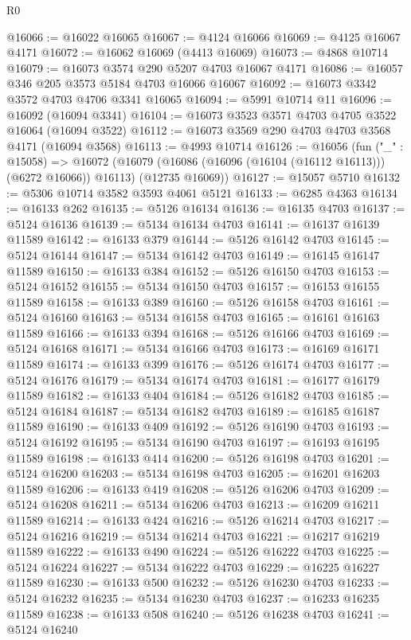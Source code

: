 \begin{lexlean}{R0}
\begin{coremodule}
@16066 := @16022 @16065
@16067 := @4124 @16066
@16069 := @4125 @16067 @4171
@16072 := @16062 @16069 (@4413 @16069)
@16073 := @4868 @10714
@16079 := @16073 @3574 @290 @5207 @4703 @16067 @4171
@16086 := @16057 @346 @205 @3573 @5184 @4703 @16066 @16067
@16092 := @16073 @3342 @3572 @4703 @4706 @3341 @16065
@16094 := @5991 @10714 @11
@16096 := @16092 (@16094 @3341)
@16104 := @16073 @3523 @3571 @4703 @4705 @3522 @16064 (@16094 @3522)
@16112 := @16073 @3569 @290 @4703 @4703 @3568 @4171 (@16094 @3568)
@16113 := @4993 @10714
@16126 := @16056
    (fun ("_" : @15058) =>
    @16072
      (@16079 (@16086 (@16096 (@16104 (@16112 @16113))) (@6272 @16066)) @16113)
      (@12735 @16069))
@16127 := @15057 @5710
@16132 := @5306 @10714 @3582 @3593 @4061 @5121
@16133 := @6285 @4363
@16134 := @16133 @262
@16135 := @5126 @16134
@16136 := @16135 @4703
@16137 := @5124 @16136
@16139 := @5134 @16134 @4703
@16141 := @16137 @16139 @11589
@16142 := @16133 @379
@16144 := @5126 @16142 @4703
@16145 := @5124 @16144
@16147 := @5134 @16142 @4703
@16149 := @16145 @16147 @11589
@16150 := @16133 @384
@16152 := @5126 @16150 @4703
@16153 := @5124 @16152
@16155 := @5134 @16150 @4703
@16157 := @16153 @16155 @11589
@16158 := @16133 @389
@16160 := @5126 @16158 @4703
@16161 := @5124 @16160
@16163 := @5134 @16158 @4703
@16165 := @16161 @16163 @11589
@16166 := @16133 @394
@16168 := @5126 @16166 @4703
@16169 := @5124 @16168
@16171 := @5134 @16166 @4703
@16173 := @16169 @16171 @11589
@16174 := @16133 @399
@16176 := @5126 @16174 @4703
@16177 := @5124 @16176
@16179 := @5134 @16174 @4703
@16181 := @16177 @16179 @11589
@16182 := @16133 @404
@16184 := @5126 @16182 @4703
@16185 := @5124 @16184
@16187 := @5134 @16182 @4703
@16189 := @16185 @16187 @11589
@16190 := @16133 @409
@16192 := @5126 @16190 @4703
@16193 := @5124 @16192
@16195 := @5134 @16190 @4703
@16197 := @16193 @16195 @11589
@16198 := @16133 @414
@16200 := @5126 @16198 @4703
@16201 := @5124 @16200
@16203 := @5134 @16198 @4703
@16205 := @16201 @16203 @11589
@16206 := @16133 @419
@16208 := @5126 @16206 @4703
@16209 := @5124 @16208
@16211 := @5134 @16206 @4703
@16213 := @16209 @16211 @11589
@16214 := @16133 @424
@16216 := @5126 @16214 @4703
@16217 := @5124 @16216
@16219 := @5134 @16214 @4703
@16221 := @16217 @16219 @11589
@16222 := @16133 @490
@16224 := @5126 @16222 @4703
@16225 := @5124 @16224
@16227 := @5134 @16222 @4703
@16229 := @16225 @16227 @11589
@16230 := @16133 @500
@16232 := @5126 @16230 @4703
@16233 := @5124 @16232
@16235 := @5134 @16230 @4703
@16237 := @16233 @16235 @11589
@16238 := @16133 @508
@16240 := @5126 @16238 @4703
@16241 := @5124 @16240

\end{coremodule}
\end{lexlean}
